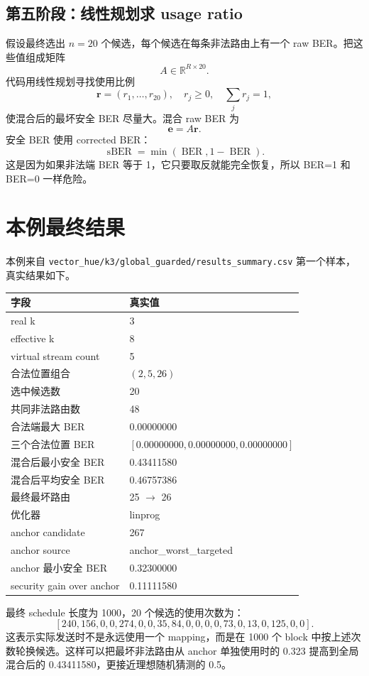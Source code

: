 \documentclass[UTF8,a4paper,11pt]{ctexart}
\newcommand{\BER}{\operatorname{BER}}
\newcommand{\sBER}{\operatorname{sBER}}
\begin{document}
\subsection{第五阶段：线性规划求 usage ratio}

假设最终选出 $n=20$ 个候选，每个候选在每条非法路由上有一个 raw BER。把这些值组成矩阵
\[
A\in\mathbb{R}^{R\times20}.
\]
代码用线性规划寻找使用比例
\[
\mathbf{r}=(r_1,\ldots,r_{20}),\quad r_j\ge 0,\quad \sum_j r_j=1,
\]
使混合后的最坏安全 BER 尽量大。混合 raw BER 为
\[
\mathbf{e}=A\mathbf{r}.
\]
安全 BER 使用 corrected BER：
\[
\sBER=\min(\BER,1-\BER).
\]
这是因为如果非法端 BER 等于 1，它只要取反就能完全恢复，所以 BER=1 和 BER=0 一样危险。

\section{本例最终结果}

本例来自 \texttt{vector\_hue/k3/global\_guarded/results\_summary.csv} 第一个样本，真实结果如下。

\begin{center}
\begin{tabular}{ll}
\toprule
字段 & 真实值\\
\midrule
real k & 3\\
effective k & 8\\
virtual stream count & 5\\
合法位置组合 & $(2,5,26)$\\
选中候选数 & 20\\
共同非法路由数 & 48\\
合法端最大 BER & 0.00000000\\
三个合法位置 BER & $[0.00000000,0.00000000,0.00000000]$\\
混合后最小安全 BER & 0.43411580\\
混合后平均安全 BER & 0.46757386\\
最终最坏路由 & 25 $\rightarrow$ 26\\
优化器 & linprog\\
anchor candidate & 267\\
anchor source & anchor\_worst\_targeted\\
anchor 最小安全 BER & 0.32300000\\
security gain over anchor & 0.11111580\\
\bottomrule
\end{tabular}
\end{center}

最终 schedule 长度为 1000，20 个候选的使用次数为：
\[
[240,156,0,0,274,0,0,35,84,0,0,0,0,73,0,13,0,125,0,0].
\]
这表示实际发送时不是永远使用一个 mapping，而是在 1000 个 block 中按上述次数轮换候选。这样可以把最坏非法路由从 anchor 单独使用时的 0.323 提高到全局混合后的 0.43411580，更接近理想随机猜测的 0.5。
\end{document}
